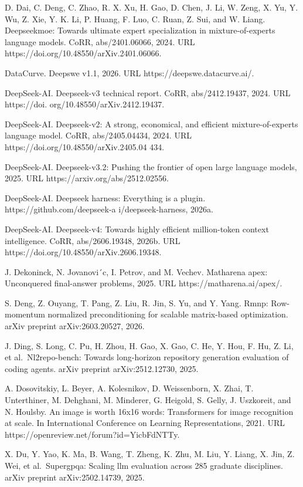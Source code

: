\documentclass[
  10
]{article}
\begin{document}
D. Dai, C. Deng, C. Zhao, R. X. Xu, H. Gao, D. Chen, J. Li, W. Zeng, X.
Yu, Y. Wu, Z. Xie, Y. K. Li, P. Huang, F. Luo, C. Ruan, Z. Sui, and W.
Liang. Deepseekmoe: Towards ultimate expert specialization in
mixture-of-experts language models. CoRR, abs/2401.06066, 2024. URL
https://doi.org/10.48550/arXiv.2401.06066.

DataCurve. Deepswe v1.1, 2026. URL https://deepswe.datacurve.ai/.

DeepSeek-AI. Deepseek-v3 technical report. CoRR, abs/2412.19437, 2024.
URL https://doi. org/10.48550/arXiv.2412.19437.

DeepSeek-AI. Deepseek-v2: A strong, economical, and efficient
mixture-of-experts language model. CoRR, abs/2405.04434, 2024. URL
https://doi.org/10.48550/arXiv.2405.04 434.

DeepSeek-AI. Deepseek-v3.2: Pushing the frontier of open large language
models, 2025. URL https://arxiv.org/abs/2512.02556.

DeepSeek-AI. Deepseek harness: Everything is a plugin.
https://github.com/deepseek-a i/deepseek-harness, 2026a.

DeepSeek-AI. Deepseek-v4: Towards highly efficient million-token context
intelligence. CoRR, abs/2606.19348, 2026b. URL
https://doi.org/10.48550/arXiv.2606.19348.

J. Dekoninck, N. Jovanovi´c, I. Petrov, and M. Vechev. Matharena apex:
Unconquered final-answer problems, 2025. URL https://matharena.ai/apex/.

S. Deng, Z. Ouyang, T. Pang, Z. Liu, R. Jin, S. Yu, and Y. Yang. Rmnp:
Row-momentum normalized preconditioning for scalable matrix-based
optimization. arXiv preprint arXiv:2603.20527, 2026.

J. Ding, S. Long, C. Pu, H. Zhou, H. Gao, X. Gao, C. He, Y. Hou, F. Hu,
Z. Li, et al.~Nl2repo-bench: Towards long-horizon repository generation
evaluation of coding agents. arXiv preprint arXiv:2512.12730, 2025.

A. Dosovitskiy, L. Beyer, A. Kolesnikov, D. Weissenborn, X. Zhai, T.
Unterthiner, M. Dehghani, M. Minderer, G. Heigold, S. Gelly, J.
Uszkoreit, and N. Houlsby. An image is worth 16x16 words: Transformers
for image recognition at scale. In International Conference on Learning
Representations, 2021. URL https://openreview.net/forum?id=YicbFdNTTy.

X. Du, Y. Yao, K. Ma, B. Wang, T. Zheng, K. Zhu, M. Liu, Y. Liang, X.
Jin, Z. Wei, et al.~Supergpqa: Scaling llm evaluation across 285
graduate disciplines. arXiv preprint arXiv:2502.14739, 2025.
\end{document}
